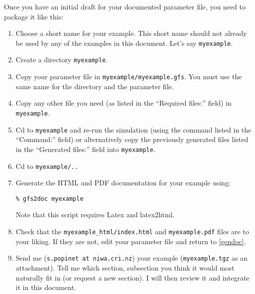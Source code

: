 \documentclass[a4paper]{article}
\begin{document}
Once you have an initial draft for your documented parameter file, you need to package it like this:
\begin{enumerate}
\item Choose a short name for your example. This short name should not already be used by any of the examples in this document. Let's say {\tt myexample}.
\item Create a directory {\tt myexample}.
\item Copy your parameter file in {\tt myexample/myexample.gfs}. You must use the same name for the directory and the parameter file.
\item Copy any other file you need (as listed in the ``Required files:'' field) in {\tt myexample}.
\item Cd to {\tt myexample} and re-run the simulation (using the command listed in the ``Command:'' field) or alternatively copy the previously generated files listed in the ``Generated files:'' field into {\tt myexample}.
\item Cd to {\tt myexample/..}
\item\label{gendoc} Generate the HTML and PDF documentation for your example using:
\begin{verbatim}
% gfs2doc myexample
\end{verbatim}
Note that this script requires Latex and latex2html.
\item Check that the {\tt myexample\_html/index.html} and {\tt myexample.pdf} files are to your liking. If they are not, edit your parameter file and return to \ref{gendoc}.
\item Send me ({\tt s.popinet at niwa.cri.nz}) your example ({\tt myexample.tgz} as an attachment). Tell me which section, subsection you think it would most naturally fit in (or request a new section). I will then review it and integrate it in this document.
\end{enumerate}
\end{document}
